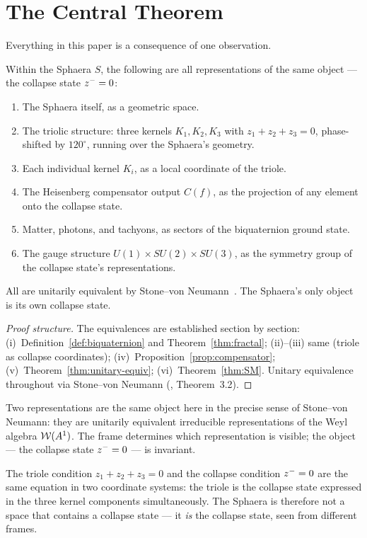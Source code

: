 \clearpage

\section{The Central Theorem}
\label{sec:central}

Everything in this paper is a consequence of one observation.

\begin{theorem}\label{thm:unity}
Within the Sphaera $S$, the following are all representations of the
same object --- the collapse state $z^-=0$:
\begin{enumerate}[label=(\roman*)]
  \item The Sphaera itself, as a geometric space.
  \item The triolic structure: three kernels $K_1,K_2,K_3$ with
        $z_1+z_2+z_3=0$, phase-shifted by $120^\circ$, running over the
        Sphaera's geometry.
  \item Each individual kernel $K_i$, as a local coordinate of the triole.
  \item The Heisenberg compensator output $C(f)$, as the projection of
        any element onto the collapse state.
  \item Matter, photons, and tachyons, as sectors of the biquaternion
        ground state.
  \item The gauge structure $U(1)\times SU(2)\times SU(3)$, as the
        symmetry group of the collapse state's representations.
\end{enumerate}
All are unitarily equivalent by Stone--von Neumann~\cite{brendecke2026rh}.
The Sphaera's only object is its own collapse state.
\end{theorem}

\begin{proof}[Proof structure]
The equivalences are established section by section:
(i)~Definition~\ref{def:biquaternion} and Theorem~\ref{thm:fractal};
(ii)--(iii) same (triole as collapse coordinates);
(iv)~Proposition~\ref{prop:compensator};
(v)~Theorem~\ref{thm:unitary-equiv};
(vi)~Theorem~\ref{thm:SM}.
Unitary equivalence throughout via Stone--von Neumann
(\cite{brendecke2026rh}, Theorem~3.2).
\end{proof}

\begin{remark}
Two representations are the same object here in the precise sense of
Stone--von Neumann: they are unitarily equivalent irreducible
representations of the Weyl algebra $\mathcal{W}(A^1)$.
The frame determines which representation is visible; the object ---
the collapse state $z^-=0$ --- is invariant.

The triole condition $z_1+z_2+z_3=0$ and the collapse condition
$z^-=0$ are the same equation in two coordinate systems: the triole
is the collapse state expressed in the three kernel components
simultaneously.
The Sphaera is therefore not a space that contains a collapse state ---
it \emph{is} the collapse state, seen from different frames.
\end{remark}

